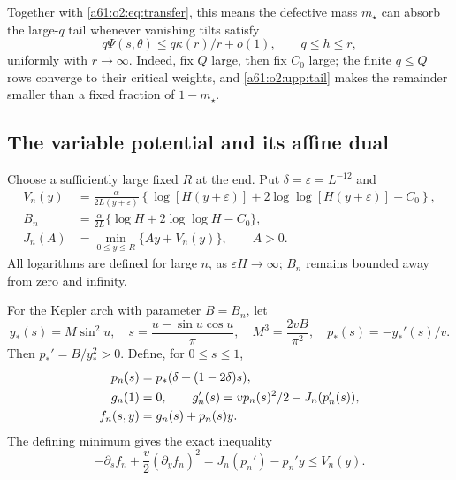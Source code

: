 \documentclass[11pt,letterpaper]{article}
\numberwithin{equation}{section}
\theoremstyle{remark}\newtheorem{remark}[theorem]{Remark}
\newcommand{\st}{\star}
\begin{document}
Together with \eqref{a61:o2:eq:transfer}, this means the defective mass $m_\st$ can absorb the large-$q$ tail whenever vanishing tilts satisfy
\begin{equation}\label{a61:o2:upp:tailcondition}
 q\Psi(s,\theta)\le q\kappa(r)/r+o(1),\qquad q\le h\le r,
\end{equation}
uniformly with $r\to\infty$. Indeed, fix $Q$ large, then fix $C_0$ large; the finite $q\le Q$ rows converge to their critical weights, and \eqref{a61:o2:upp:tail} makes the remainder smaller than a fixed fraction of $1-m_\st$.

\subsection{The variable potential and its affine dual}
Choose a sufficiently large fixed $R$ at the end. Put $\delta=\varepsilon=L^{-12}$ and
\begin{align}
 V_n(y)&=\frac{\alpha}{2L(y+\varepsilon)}
  \left\{\log[H(y+\varepsilon)]
          +2\log\log[H(y+\varepsilon)]-C_0\right\},\label{a61:o2:upp:potential}\\
 B_n&=\frac\alpha{2L}\{\log H+2\log\log H-C_0\},\label{a61:o2:upp:B}\\
 J_n(A)&=\min_{0\le y\le R}\{Ay+V_n(y)\},\qquad A>0.\label{a61:o2:upp:dual}
\end{align}
All logarithms are defined for large $n$, as $\varepsilon H\to\infty$; $B_n$ remains bounded away from zero and infinity.

For the Kepler arch with parameter $B=B_n$, let
\begin{equation}\label{a61:o2:upp:arch}
 y_*(s)=M\sin^2u,\quad
 s=\frac{u-\sin u\cos u}{\pi},\quad
 M^3=\frac{2vB}{\pi^2},\quad
 p_*(s)=-y_*'(s)/v.
\end{equation}
Then $p_*'=B/y_*^2>0$. Define, for $0\le s\le1$,
\begin{align}
 p_n(s)&=p_*(\delta+(1-2\delta)s),\notag\\
 g_n(1)&=0,\qquad g_n'(s)=vp_n(s)^2/2-J_n(p_n'(s)),\notag\\
 f_n(s,y)&=g_n(s)+p_n(s)y.\label{a61:o2:upp:calibration}
\end{align}
The defining minimum gives the exact inequality
\begin{equation}\label{a61:o2:upp:HJ}
 -\partial_s f_n+\frac v2(\partial_y f_n)^2
 =J_n(p_n')-p_n'y\le V_n(y).
\end{equation}
\end{document}
